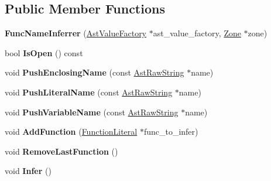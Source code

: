 \subsection*{Public Member Functions}
\begin{DoxyCompactItemize}
\item 
{\bfseries Func\+Name\+Inferrer} (\hyperlink{classv8_1_1internal_1_1_ast_value_factory}{Ast\+Value\+Factory} $\ast$ast\+\_\+value\+\_\+factory, \hyperlink{classv8_1_1internal_1_1_zone}{Zone} $\ast$zone)\hypertarget{classv8_1_1internal_1_1_func_name_inferrer_abf5de4a300ebd2d7b400c1a6fd1dc50f}{}\label{classv8_1_1internal_1_1_func_name_inferrer_abf5de4a300ebd2d7b400c1a6fd1dc50f}

\item 
bool {\bfseries Is\+Open} () const \hypertarget{classv8_1_1internal_1_1_func_name_inferrer_a3c626832f49fc0a40ebaa1cd1964c253}{}\label{classv8_1_1internal_1_1_func_name_inferrer_a3c626832f49fc0a40ebaa1cd1964c253}

\item 
void {\bfseries Push\+Enclosing\+Name} (const \hyperlink{classv8_1_1internal_1_1_ast_raw_string}{Ast\+Raw\+String} $\ast$name)\hypertarget{classv8_1_1internal_1_1_func_name_inferrer_a71629cf92978a0fb0752b23fc9e0899b}{}\label{classv8_1_1internal_1_1_func_name_inferrer_a71629cf92978a0fb0752b23fc9e0899b}

\item 
void {\bfseries Push\+Literal\+Name} (const \hyperlink{classv8_1_1internal_1_1_ast_raw_string}{Ast\+Raw\+String} $\ast$name)\hypertarget{classv8_1_1internal_1_1_func_name_inferrer_ab2bfb7ed805afa622a93d011c7abffae}{}\label{classv8_1_1internal_1_1_func_name_inferrer_ab2bfb7ed805afa622a93d011c7abffae}

\item 
void {\bfseries Push\+Variable\+Name} (const \hyperlink{classv8_1_1internal_1_1_ast_raw_string}{Ast\+Raw\+String} $\ast$name)\hypertarget{classv8_1_1internal_1_1_func_name_inferrer_a0b9bd975bb3de9f0fb992d37191409fd}{}\label{classv8_1_1internal_1_1_func_name_inferrer_a0b9bd975bb3de9f0fb992d37191409fd}

\item 
void {\bfseries Add\+Function} (\hyperlink{classv8_1_1internal_1_1_function_literal}{Function\+Literal} $\ast$func\+\_\+to\+\_\+infer)\hypertarget{classv8_1_1internal_1_1_func_name_inferrer_a28e663e6a0d31f9aaa19dd9c16ce1089}{}\label{classv8_1_1internal_1_1_func_name_inferrer_a28e663e6a0d31f9aaa19dd9c16ce1089}

\item 
void {\bfseries Remove\+Last\+Function} ()\hypertarget{classv8_1_1internal_1_1_func_name_inferrer_abc2f4a37cc46c2a8208475fb883db140}{}\label{classv8_1_1internal_1_1_func_name_inferrer_abc2f4a37cc46c2a8208475fb883db140}

\item 
void {\bfseries Infer} ()\hypertarget{classv8_1_1internal_1_1_func_name_inferrer_a7b3044baeb6bda1f317048e80dd2a8e9}{}\label{classv8_1_1internal_1_1_func_name_inferrer_a7b3044baeb6bda1f317048e80dd2a8e9}

\end{DoxyCompactItemize}
